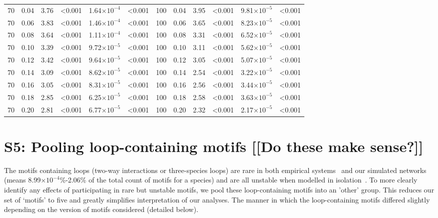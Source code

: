 \documentclass[12pt]{article}
\begin{document}
\begin{spacing}{2.0}
\begin{table}[h!]
\begin{tabular}{c c | c c| c c ||c c | c c | c c |}
	        70	&	0.04	&	3.76	&	\textless0.001	&	1.64$\times10^{-4}$	&	\textless0.001	&	100	&	0.04	&	3.95	&	\textless0.001	&	9.81$\times10^{-5}$	&	\textless0.001	\\
	        70	&	0.06	&	3.83	&	\textless0.001	&	1.46$\times10^{-4}$	&	\textless0.001	&	100	&	0.06	&	3.65	&	\textless0.001	&	8.23$\times10^{-5}$	&	\textless0.001	\\
	        70	&	0.08	&	3.64	&	\textless0.001	&	1.11$\times10^{-4}$	&	\textless0.001	&	100	&	0.08	&	3.31	&	\textless0.001	&	6.52$\times10^{-5}$	&	\textless0.001	\\
	        70	&	0.10	&	3.39	&	\textless0.001	&	9.72$\times10^{-5}$	&	\textless0.001	&	100	&	0.10	&	3.11	&	\textless0.001	&	5.62$\times10^{-5}$	&	\textless0.001	\\
	        70	&	0.12	&	3.42	&	\textless0.001	&	9.64$\times10^{-5}$	&	\textless0.001	&	100	&	0.12	&	3.05	&	\textless0.001	&	5.07$\times10^{-5}$	&	\textless0.001	\\
	        70	&	0.14	&	3.09	&	\textless0.001	&	8.62$\times10^{-5}$	&	\textless0.001	&	100	&	0.14	&	2.54	&	\textless0.001	&	3.22$\times10^{-5}$	&	\textless0.001	\\
	        70	&	0.16	&	3.05	&	\textless0.001	&	8.31$\times10^{-5}$	&	\textless0.001	&	100	&	0.16	&	2.56	&	\textless0.001	&	3.44$\times10^{-5}$	&	\textless0.001	\\
	        70	&	0.18	&	2.85	&	\textless0.001	&	6.25$\times10^{-5}$	&	\textless0.001	&	100	&	0.18	&	2.58	&	\textless0.001	&	3.63$\times10^{-5}$	&	\textless0.001	\\
	        70	&	0.20	&	2.81	&	\textless0.001	&	6.77$\times10^{-5}$	&	\textless0.001	&	100	&	0.20	&	2.32	&	\textless0.001	&	2.17$\times10^{-5}$	&	\textless0.001	\\

	    \end{tabular}
	    \end{table}

\clearpage


\section*{S5: Pooling loop-containing motifs [[Do these make sense?]]}
	
	The motifs containing loops (two-way interactions or three-species loops) are rare in both empirical systems~\citep{StoufferXXXX} and our simulated networks (means 8.99$\times10^{-4}$\%-2.06\% of the total count of motifs for a species) and are all unstable when modelled in isolation~\citep{BorrelliXXXX}.
	To more clearly identify any effects of participating in rare but unstable motifs, we pool these loop-containing motifs into an 'other' group.
	This reduces our set of `motifs' to five and greatly simplifies interpretation of our analyses.
	The manner in which the loop-containing motifs differed slightly depending on the version of motifs considered (detailed below).



\end{spacing}
\end{document}
